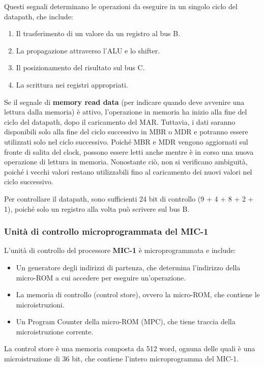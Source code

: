 Questi segnali determinano le operazioni da eseguire in un singolo ciclo del datapath, che include:
\begin{enumerate}
    \item Il trasferimento di un valore da un registro al bus B.
    \item La propagazione attraverso l'ALU e lo shifter.
    \item Il posizionamento del risultato sul bus C.
    \item La scrittura nei registri appropriati.
\end{enumerate}

Se il segnale di \textbf{memory read data} (per indicare quando deve avvenire una lettura dalla memoria) è attivo, l'operazione in memoria ha inizio alla fine del ciclo del datapath, dopo il caricamento del MAR. Tuttavia, i dati saranno disponibili solo alla fine del ciclo successivo in MBR o MDR e potranno essere utilizzati solo nel ciclo successivo. Poiché MBR e MDR vengono aggiornati sul fronte di salita del clock, possono essere letti anche mentre è in corso una nuova operazione di lettura in memoria. Nonostante ciò, non si verificano ambiguità, poiché i vecchi valori restano utilizzabili fino al caricamento dei nuovi valori nel ciclo successivo.

Per controllare il datapath, sono sufficienti 24 bit di controllo (9 + 4 + 8 + 2 + 1), poiché solo un registro alla volta può scrivere sul bus B.

\subsubsection*{Unità di controllo microprogrammata del MIC-1}

L'unità di controllo del processore \textbf{MIC-1} è microprogrammata e include:
\begin{itemize}
    \item Un generatore degli indirizzi di partenza, che determina l'indirizzo della micro-ROM a cui accedere per eseguire un'operazione.
    \item La memoria di controllo (control store), ovvero la micro-ROM, che contiene le microistruzioni.
    \item Un Program Counter della micro-ROM (MPC), che tiene traccia della microistruzione corrente.
\end{itemize}

La control store è una memoria composta da 512 word, ognuna delle quali è una microistruzione di 36 bit, che contiene l'intero microprogramma del MIC-1.

